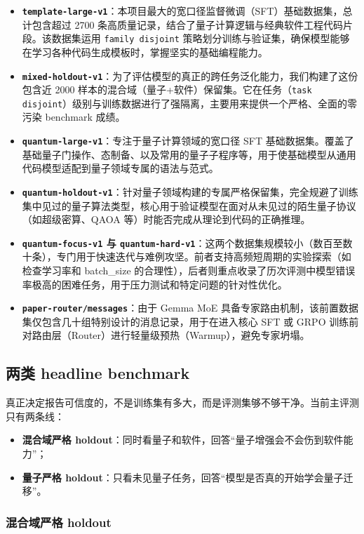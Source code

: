 \documentclass[11pt,a4paper]{article}
\newcommand{\code}[1]{\begingroup\ttfamily\footnotesize\nolinkurl{#1}\endgroup}
\begin{document}
\begin{itemize}
    \item \textbf{\code{template-large-v1}}：本项目最大的宽口径监督微调（SFT）基础数据集，总计包含超过 2700 条高质量记录，结合了量子计算逻辑与经典软件工程代码片段。该数据集运用 \code{family disjoint} 策略划分训练与验证集，确保模型能够在学习各种代码生成模板时，掌握坚实的基础编程能力。
    \item \textbf{\code{mixed-holdout-v1}}：为了评估模型的真正的跨任务泛化能力，我们构建了这份包含近 2000 样本的混合域（量子+软件）保留集。它在任务（\code{task disjoint}）级别与训练数据进行了强隔离，主要用来提供一个严格、全面的零污染 benchmark 成绩。
    \item \textbf{\code{quantum-large-v1}}：专注于量子计算领域的宽口径 SFT 基础数据集。覆盖了基础量子门操作、态制备、以及常用的量子子程序等，用于使基础模型从通用代码模型适配到量子领域专属的语法与范式。
    \item \textbf{\code{quantum-holdout-v1}}：针对量子领域构建的专属严格保留集，完全规避了训练集中见过的量子算法类型，核心用于验证模型在面对从未见过的陌生量子协议（如超级密算、QAOA 等）时能否完成从理论到代码的正确推理。
    \item \textbf{\code{quantum-focus-v1} 与 \code{quantum-hard-v1}}：这两个数据集规模较小（数百至数十条），专门用于快速迭代与难例攻坚。前者支持高频短周期的实验探索（如检查学习率和 batch\_size 的合理性），后者则重点收录了历次评测中模型错误率极高的困难任务，用于压力测试和特定问题的针对性优化。
    \item \textbf{\code{paper-router/messages}}：由于 Gemma MoE 具备专家路由机制，该前置数据集仅包含几十组特别设计的消息记录，用于在进入核心 SFT 或 GRPO 训练前对路由层（Router）进行轻量级预热（Warmup），避免专家坍塌。
\end{itemize}


\subsection{两类 headline benchmark}

真正决定报告可信度的，不是训练集有多大，而是评测集够不够干净。当前主评测只有两条线：
\begin{itemize}
  \item \textbf{混合域严格 holdout}：同时看量子和软件，回答“量子增强会不会伤到软件能力”；
  \item \textbf{量子严格 holdout}：只看未见量子任务，回答“模型是否真的开始学会量子迁移”。
\end{itemize}

\subsubsection{混合域严格 holdout}
\end{document}
